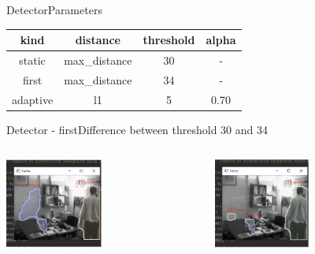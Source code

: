 \documentclass{beamer}
\begin{document}
\begin{frame}[fragile]{Detector}{Parameters}
    \begin{tabular}{cccc}
        kind     & distance      & threshold & alpha\footnotemark \\
        \hline
        static   & max\_distance & 30        & -     \\
        first    & max\_distance & 34        & -     \\
        adaptive & l1            & 5         & 0.70
    \end{tabular}
\end{frame}

\begin{frame}{Detector - first}{Difference between threshold 30 and 34}
    \begin{columns}
        \begin{column}[t]{0.5\paperwidth}
            \centering
            \includegraphics[width=0.5\textwidth,keepaspectratio]{background_first_30.PNG}
        \end{column}
        \begin{column}[t]{0.5\paperwidth}
            \centering
            \includegraphics[width=0.5\textwidth,keepaspectratio]{background_first_34.PNG}
        \end{column}
    \end{columns}
\end{frame}
\end{document}
